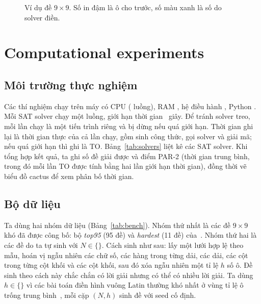 \documentclass[a4paper,fleqn]{cas-sc}
\newcommand{\MachineCPU}{}\newcommand{\MachineCores}{}\newcommand{\MachineRAM}{}
\newcommand{\MachineOS}{}\newcommand{\PythonVersion}{}\newcommand{\TimeLimit}{}
\newcommand{\RepeatText}{}\newcommand{\FixedSolver}{}\newcommand{\BestConfig}{}
\newcommand{\GenSizes}{}\newcommand{\HoleRatios}{}
\begin{document}
\begin{figure}[t]
\centering

\caption{Ví dụ đề $9\times9$. Số in đậm là ô cho trước, số màu xanh là số do solver điền.}
\label{fig:example}
\end{figure}

\section{Computational experiments}\label{sec:exp}

\subsection{Môi trường thực nghiệm}\label{sec:setup}

Các thí nghiệm chạy trên máy có CPU \MachineCPU{} (\MachineCores{} luồng), RAM \MachineRAM, hệ điều hành \MachineOS, Python \PythonVersion. Mỗi SAT solver chạy một luồng, giới hạn thời gian \TimeLimit~giây. \RepeatText{} Để tránh solver treo, mỗi lần chạy là một tiến trình riêng và bị dừng nếu quá giới hạn. Thời gian ghi lại là thời gian thực của cả lần chạy, gồm sinh công thức, gọi solver và giải mã; nếu quá giới hạn thì ghi là TO. Bảng~\ref{tab:solvers} liệt kê các SAT solver. Khi tổng hợp kết quả, ta ghi số đề giải được và điểm PAR-2 (thời gian trung bình, trong đó mỗi lần TO được tính bằng hai lần giới hạn thời gian), đồng thời vẽ biểu đồ cactus để xem phân bố thời gian.

\begin{table}[t]
\caption{Các SAT solver và cách gọi. ``không chạy'' nghĩa là solver không cài được trên máy thử nghiệm.}
\label{tab:solvers}
\centering\small

\end{table}

\subsection{Bộ dữ liệu}\label{sec:bench}

Ta dùng hai nhóm dữ liệu (Bảng~\ref{tab:bench}). Nhóm thứ nhất là các đề $9\times9$ khó đã được công bố: bộ \emph{top95} (95 đề) và \emph{hardest} (11 đề) của~\citet{norvig}. Nhóm thứ hai là các đề do ta tự sinh với $N\in\{\GenSizes\}$. Cách sinh như sau: lấy một lưới hợp lệ theo mẫu, hoán vị ngẫu nhiên các chữ số, các hàng trong từng dải, các dải, các cột trong từng cột khối và các cột khối, sau đó xóa ngẫu nhiên một tỉ lệ $h$ số ô. Đề sinh theo cách này chắc chắn có lời giải nhưng có thể có nhiều lời giải. Ta dùng $h\in\{\HoleRatios\}$ vì các bài toán điền hình vuông Latin thường khó nhất ở vùng tỉ lệ ô trống trung bình~\citep{gomes1997}, mỗi cặp $(N,h)$ sinh \GenPerCell{} đề với seed cố định.
\end{document}
